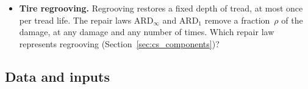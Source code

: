 \documentclass[11pt,a4paper]{article}
\theoremstyle{plain}
\theoremstyle{definition}
\theoremstyle{remark}
\begin{document}
\begin{itemize}
\begin{itemize}
        In every repetition in which an inverter gains damage, the loop rows force a replacement, even when the operating phase is much shorter than the life of the inverter.
        Should a flag per component forbid the full replacement of a long-lived component in the horizon, with an input check that every component that gains damage can be repaired down?
        The flag cannot apply to the inverter.
    \end{itemize}
  \item \textbf{Tire regrooving.}
    Regrooving restores a fixed depth of tread, at most once per tread life.
    The repair laws $\text{ARD}_\infty$ and $\text{ARD}_1$ remove a fraction~$\rho$ of the damage, at any damage and any number of times.
    Which repair law represents regrooving (Section~\ref{sec:cs_components})?
\end{itemize}

\subsection{Data and inputs}
\end{document}
